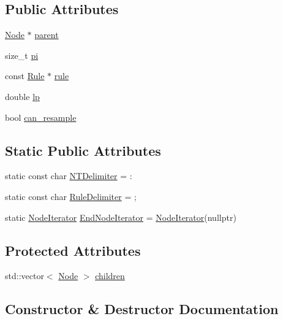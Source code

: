 \subsection*{Public Attributes}
\begin{DoxyCompactItemize}
\item 
\hyperlink{class_node}{Node} $\ast$ \hyperlink{class_node_ad8184598cdea70e4bbdfd76f2b0f9e85}{parent}
\item 
size\+\_\+t \hyperlink{class_node_ad8e140a5af4e5c312141f2b7af255520}{pi}
\item 
const \hyperlink{class_rule}{Rule} $\ast$ \hyperlink{class_node_a02f5c9463cceb270ad5730760f19c722}{rule}
\item 
double \hyperlink{class_node_a298eaa3743b774a3f9ef396e1dc42a08}{lp}
\item 
bool \hyperlink{class_node_a98c14a51b240fbc7e438f40a12276257}{can\+\_\+resample}
\end{DoxyCompactItemize}
\subsection*{Static Public Attributes}
\begin{DoxyCompactItemize}
\item 
static const char \hyperlink{class_node_abd26102ffbe2a3e00c34bed5508b3234}{N\+T\+Delimiter} = \textquotesingle{}\+:\textquotesingle{}
\item 
static const char \hyperlink{class_node_ab58932e82964fb75ba806870c4069dc2}{Rule\+Delimiter} = \textquotesingle{};\textquotesingle{}
\item 
static \hyperlink{class_node_1_1_node_iterator}{Node\+Iterator} \hyperlink{class_node_a336943f2e37a2b6fcbe8b47634719dec}{End\+Node\+Iterator} = \hyperlink{class_node_1_1_node_iterator}{Node\+Iterator}(nullptr)
\end{DoxyCompactItemize}
\subsection*{Protected Attributes}
\begin{DoxyCompactItemize}
\item 
std\+::vector$<$ \hyperlink{class_node}{Node} $>$ \hyperlink{class_node_af7ddc81358470c3bf7a7819c8b77f53d}{children}
\end{DoxyCompactItemize}


\subsection{Constructor \& Destructor Documentation}
\mbox{\label{class_node_ae33050869651f64551da2d13ad2a9dbc}} 
